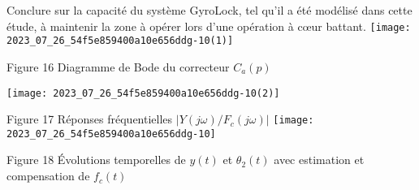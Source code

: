 Conclure sur la capacité du système GyroLock, tel qu'il a été modélisé dans cette étude, à maintenir la zone à opérer lors d'une opération à cœur battant.
\texttt{[image: 2023\_07\_26\_54f5e859400a10e656ddg-10(1)]}

Figure 16 Diagramme de Bode du correcteur $C_{a}(p)$

\begin{center}
\texttt{[image: 2023\_07\_26\_54f5e859400a10e656ddg-10(2)]}
\end{center}

Figure 17 Réponses fréquentielles $\left|Y(j \omega) / F_{c}(j \omega)\right|$
\texttt{[image: 2023\_07\_26\_54f5e859400a10e656ddg-10]}

Figure 18 Évolutions temporelles de $y(t)$ et $\theta_{2}(t)$ avec estimation et compensation de $f_{c}(t)$


%